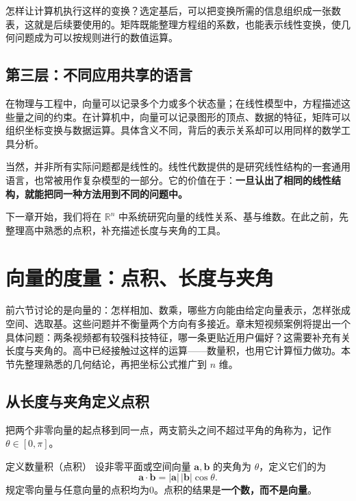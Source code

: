 \documentclass[a4paper,12pt,twoside,openany,fontset=none]{ctexbook}
\newcounter{definition}[chapter]
\newenvironment{definition}[1][]{\begin{defBox}{定义}{#1}}{\end{defBox}}
\numberwithin{equation}{chapter}
\begin{document}
怎样让计算机执行这样的变换？选定基后，可以把变换所需的信息组织成一张数表，这就是后续要使用的\textbf{}。矩阵既能整理方程组的系数，也能表示线性变换，使几何问题成为可以按规则进行的数值运算。

\subsection*{第三层：不同应用共享的语言}

在物理与工程中，向量可以记录多个力或多个状态量；在线性模型中，方程描述这些量之间的约束。在计算机中，向量可以记录图形的顶点、数据的特征，矩阵可以组织坐标变换与数据运算。具体含义不同，背后的表示关系却可以用同样的数学工具分析。

当然，并非所有实际问题都是线性的。线性代数提供的是研究线性结构的一套通用语言，也常被用作复杂模型的一部分。它的价值在于：\textbf{一旦认出了相同的线性结构，就能把同一种方法用到不同的问题中。}

下一章开始，我们将在 $\mathbb{R}^n$ 中系统研究向量的线性关系、基与维数。在此之前，先整理高中熟悉的点积，补充描述长度与夹角的工具。

\clearpage
\section{向量的度量：点积、长度与夹角}
\label{sec:zero-metric}

前六节讨论的是向量的：怎样相加、数乘，哪些方向能由给定向量表示，怎样张成空间、选取基。这些问题并不衡量两个方向有多接近。章末短视频案例将提出一个具体问题：两条视频都有较强科技特征，哪一条更贴近用户偏好？这需要补充有关长度与夹角的。高中已经接触过这样的运算——数量积，也用它计算恒力做功。本节先整理熟悉的几何结论，再把坐标公式推广到 $n$ 维。

\subsection*{从长度与夹角定义点积}

把两个非零向量的起点移到同一点，两支箭头之间不超过平角的角称为，记作 $\theta\in[0,\pi]$。

\begin{definition}[数量积（点积）]
设非零平面或空间向量 $\boldsymbol{a},\boldsymbol{b}$ 的夹角为 $\theta$，定义它们的为
\begin{equation}
 \boldsymbol{a}\cdot\boldsymbol{b}
 =|\boldsymbol{a}|\,|\boldsymbol{b}|\cos\theta.
 \label{eq:zero-dot-geometric}
\end{equation}
规定零向量与任意向量的点积均为0。点积的结果是\textbf{一个数，而不是向量}。
\end{definition}
\end{document}
